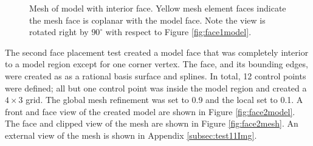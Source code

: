\documentclass[a4paper, 12pt]{article}
\begin{document}
\begin{figure}[H]
  \centering
  \caption{Mesh of model with interior face.
        Yellow mesh element faces indicate the mesh face is coplanar with the
        model face. Note the view is rotated right by $90^{\circ}$ with respect 
        to Figure \ref{fig:face1model}.}
  \label{fig:face1mesh}
\end{figure}

The second face placement test created a model face that was completely 
interior to a model region except for one corner vertex. 
The face, and its bounding edges,  were created as 
as a rational basis surface and splines. In total, 12 control points were 
defined; all but one control point was inside the model region and created a $4\times3$
grid. The global mesh refinement was set to 0.9 and the local set to 0.1. 
A front and face view of the created model are shown in Figure \ref{fig:face2model}.
The face and clipped view of the mesh are shown in Figure \ref{fig:face2mesh}.
An external view of the mesh is shown in Appendix \ref{subsec:test11Img}.
\end{document}
